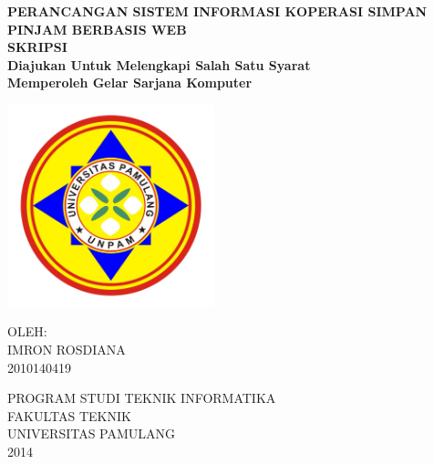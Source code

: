 \begin{center}
	\onehalfspacing
	\large \bfseries PERANCANGAN SISTEM INFORMASI KOPERASI SIMPAN PINJAM BERBASIS WEB \\
	\vspace{1cm}
	 \large SKRIPSI \\
	 \normalsize Diajukan Untuk Melengkapi Salah Satu Syarat \\ Memperoleh Gelar Sarjana Komputer
	
	\vspace{2cm}
	
	\includegraphics[width=6cm]{images/logo-unpam.png}
	
	\vspace{1cm}
	\large OLEH: \\
	IMRON ROSDIANA \\
	2010140419
	
	\vspace{3cm}
	
	\normalsize PROGRAM STUDI TEKNIK INFORMATIKA \\
	\large FAKULTAS TEKNIK \\
	UNIVERSITAS PAMULANG \\
	2014
	

	
\end{center}

\newpage